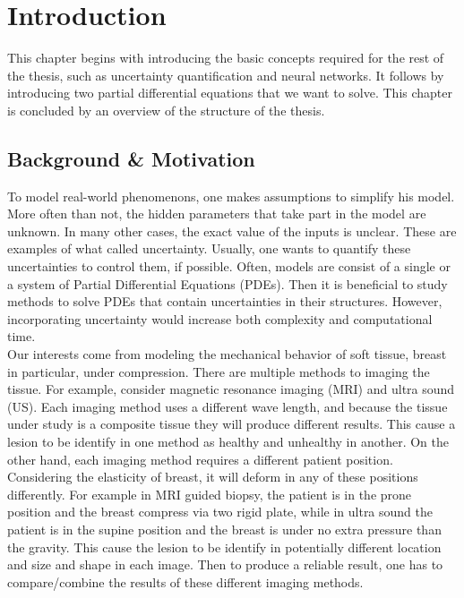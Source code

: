 \chapter{Introduction}
\setcounter{page}{1}
This chapter begins with introducing the basic concepts required for the rest of the thesis, such as uncertainty quantification and neural networks. It follows by introducing two partial differential equations that we want to solve. This chapter is concluded by an overview of the structure of the thesis. 
\section{Background \& Motivation}
\label{sec:Background_And_Motivations}
To model real-world phenomenons, one makes assumptions to simplify his model. More often than not, the hidden parameters that take part in the model are unknown. In many other cases, the exact value of the inputs is unclear. These are examples of what called uncertainty. Usually, one wants to quantify these uncertainties to control them, if possible. Often, models are consist of a single or a system of Partial Differential Equations (PDEs). Then it is beneficial to study methods to solve PDEs that contain uncertainties in their structures. However, incorporating uncertainty would increase both complexity and computational time.\\
Our interests come from modeling the mechanical behavior of soft tissue, breast in particular, under compression. There are multiple methods to imaging the tissue. For example, consider magnetic resonance imaging (MRI) and ultra sound (US).‬ Each imaging method uses a different wave length, and because the tissue under study is a composite tissue they will produce different results. This cause a lesion to be identify in one method as healthy and unhealthy in another. On the other hand, each imaging method requires a different patient position. Considering the elasticity of breast, it will deform in any of these positions differently. For example in MRI guided biopsy, the patient is in the prone position and the breast compress via two rigid plate, while in ultra sound the patient is in the supine position and the breast is under no extra pressure than the gravity. This cause the lesion to be identify in potentially different location and size and shape in each image. Then to produce a reliable result, one has to compare/combine the results of these different imaging methods.\\
